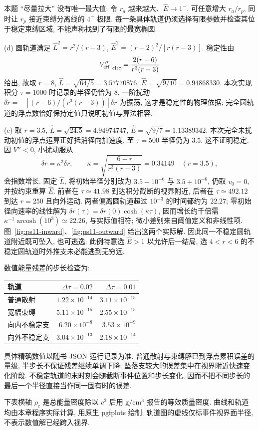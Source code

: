 \begin{solution}
本题 ``尽量拉大'' 没有唯一最大值: 令 $r_a$ 越来越大、$\hat E\to1^-$, 可任意增大 $r_a/r_p$, 同时让 $r_p$ 接近束缚分离线的 $4^+$ 极限. 每一条具体轨道仍须选择有限参数并检查其位于稳定束缚区域, 不能声称找到了有限的最宽椭圆.

(d) 圆轨道满足 $\hat L^2=r^2/(r-3)$, $\hat E^2=(r-2)^2/[r(r-3)]$. 稳定性由
\[
V''_{\rm eff}\big|_{\rm circ}=\frac{2(r-6)}{r^3(r-3)}
\]
给出, 故取 $r=8$, $\hat L=\sqrt{64/5}=3.57770876$, $\hat E=\sqrt{9/10}=0.94868330$. 本次实现积分 $\tau=1000$ 时记录的半径仍恰为 8. 一阶扰动 $\delta\ddot r=-[(r-6)/(r^3(r-3))]\delta r$ 为振荡, 这才是稳定性的物理依据; 完全圆轨道的浮点数恰好保持定值只说明初值与算法相容.

(e) 取 $r=3.5$, $\hat L=\sqrt{24.5}=4.94974747$, $\hat E=\sqrt{9/7}=1.13389342$. 本次完全未扰动初值的浮点运算正好抵消径向加速度, 至 $\tau=500$ 半径仍为 3.5. 这不证明稳定. 因 $V''<0$, 小扰动服从
\[
\delta\ddot r=\kappa^2\delta r,\qquad
\kappa=\sqrt{\frac{6-r}{r^3(r-3)}}=0.34149\quad(r=3.5),
\]
会指数增长. 固定 $\hat L$, 将初始半径分别改为 $3.5-10^{-6}$ 与 $3.5+10^{-6}$, 仍取 $v_0=0$, 并按约束重算 $\hat E$. 前者在 $\tau\simeq41.98$ 到达积分截断的视界附近, 后者在 $\tau\simeq492.12$ 到达 $r=250$ 且向外运动. 两者偏离圆轨道超过 $10^{-3}$ 的时间都约为 $22.27$; 零初始径向速率的线性解为 $\delta r(\tau)=\delta r(0)\cosh(\kappa\tau)$, 因而增长约千倍需 $\kappa^{-1}\operatorname{arcosh}(10^3)\simeq22.26$, 与实际值相符; 微小差别来自阈值定义和非线性项. 图~\ref{fig:ps11-inward}、\ref{fig:ps11-outward} 给出这两个实际解. 因此同一不稳定圆轨道附近既可坠入, 也可逃逸; 此例特意选 $\hat E>1$ 以允许后一结局, 选 $4<r<6$ 的不稳定圆轨道时外推支未必能逃到无穷远.

数值能量残差的步长检查为:
\begin{center}\begin{tabular}{lrr}\toprule
轨道 & $\Delta\tau=0.02$ & $\Delta\tau=0.01$\\\midrule
普通散射 & $1.22\times10^{-14}$ & $3.11\times10^{-15}$\\
宽幅束缚 & $5.11\times10^{-15}$ & $2.55\times10^{-15}$\\
向内不稳定支 & $6.20\times10^{-8}$ & $3.53\times10^{-9}$\\
向外不稳定支 & $3.04\times10^{-13}$ & $2.18\times10^{-14}$\\\bottomrule
\end{tabular}\end{center}
具体精确数值以随书 JSON 运行记录为准. 普通散射与束缚解已到浮点累积误差的量级, 半步长不保证残差继续单调下降; 坠落支较大的误差集中在视界附近快速变化阶段. 不稳定轨道的末时刻会随截断事件位置和步长变化, 因而不把不同步长的最后一个半径直接当作同一固有时的误差.
\end{solution}

下表横轴 $\rho_c$ 是总能量密度除以 $c^2$ 后用 $\mathrm{g/cm^3}$ 报告的等效质量密度. 曲线和轨道均由本章程序实际计算, 用原生 pgfplots 绘制; 轨道图的虚线仅标事件视界面半径, 不表示数值解已经跨入视界.

